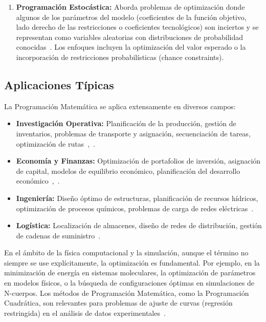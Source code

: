 \begin{enumerate}[label=\arabic*.]
    \item \textbf{Programación Estocástica:}
    Aborda problemas de optimización donde algunos de los parámetros del modelo (coeficientes de la función objetivo, lado derecho de las restricciones o coeficientes tecnológicos) son inciertos y se representan como variables aleatorias con distribuciones de probabilidad conocidas~\cite[p.~432]{sinha2006}. Los enfoques incluyen la optimización del valor esperado o la incorporación de restricciones probabilísticas (chance constraints).
\end{enumerate}


\subsection{Aplicaciones Típicas}

La Programación Matemática se aplica extensamente en diversos campos:
\begin{itemize}
    \item \textbf{Investigación Operativa:} Planificación de la producción, gestión de inventarios, problemas de transporte y asignación, secuenciación de tareas, optimización de rutas~\cite[p.~3-5]{sinha2006},~\cite[p.~1-2]{bradley1977applied}.
    \item \textbf{Economía y Finanzas:} Optimización de portafolios de inversión, asignación de capital, modelos de equilibrio económico, planificación del desarrollo económico~\cite[p.~100-102]{bradley1977applied},~\cite[p.~411]{nocedal2006}.
    \item \textbf{Ingeniería:} Diseño óptimo de estructuras, planificación de recursos hídricos, optimización de procesos químicos, problemas de carga de redes eléctricas~\cite[p.~412]{nocedal2006}.
    \item \textbf{Logística:} Localización de almacenes, diseño de redes de distribución, gestión de cadenas de suministro~\cite[p.~274]{bradley1977pe}.
\end{itemize}

En el ámbito de la física computacional y la simulación, aunque el término no siempre se use explícitamente, la optimización es fundamental. Por ejemplo, en la minimización de energía en sistemas moleculares, la optimización de parámetros en modelos físicos, o la búsqueda de configuraciones óptimas en simulaciones de N-cuerpos. Los métodos de Programación Matemática, como la Programación Cuadrática, son relevantes para problemas de ajuste de curvas (regresión restringida) en el análisis de datos experimentales~\cite[p.~412]{nocedal2006}.

